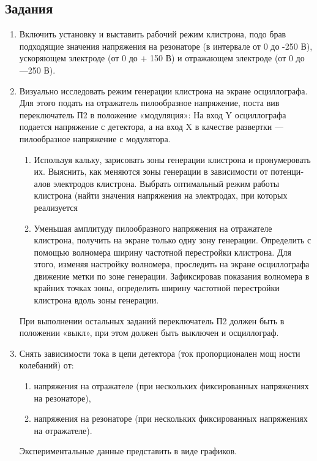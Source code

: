 \subsection{Задания}
\begin{enumerate}
	\item  Включить установку и выставить рабочий режим клистрона, подо­
	брав подходящие значения напряжения на резонаторе (в интервале от 0 до
	-250 В), ускоряющем электроде (от 0 до + 150 В) и отражающем электроде
	(от 0 до —250 В).
	\item  Визуально исследовать режим генерации клистрона на экране осциллографа. Для этого подать на отражатель пилообразное напряжение, поста­
	вив переключатель П2 в положение «модуляция»: На вход Y осциллографа
	подается напряжение с детектора, а на вход X в качестве развертки — пилообразное напряжение с модулятора.
		\begin{enumerate}
			\item Используя кальку, зарисовать зоны генерации клистрона и пронумеровать их. Выяснить, как меняются зоны генерации в зависимости от потенци­
			алов электродов клистрона. Выбрать оптимальный режим работы клистрона (найти значения напряжения на электродах, при которых реализуется
			\item Уменьшая амплитуду пилообразного напряжения на отражателе клистрона, получить на экране только одну зону генерации. Определить с  по­мощью волномера ширину частотной перестройки клистрона. Для этого, из­меняя настройку волномера, проследить на экране осциллографа движение
			метки по зоне генерации. Зафиксировав показания волномера в крайних	точках зоны, определить ширину частотной перестройки клистрона вдоль
			зоны генерации.
		\end{enumerate}
	
	При выполнении остальных заданий переключатель П2 должен быть в	положении «выкл», при этом должен быть выключен и осциллограф.

	\item Снять зависимости тока в цепи детектора (ток пропорционален мощ­
	ности колебаний) от: 
		\begin{enumerate}
			\item напряжения на отражателе (при нескольких фиксированных напряжениях на резонаторе),
			\item напряжения на резонаторе (при нескольких фиксированных напряжениях на отражателе).
		\end{enumerate} 
	Экспериментальные данные представить в виде графиков.
	

\end{enumerate}

